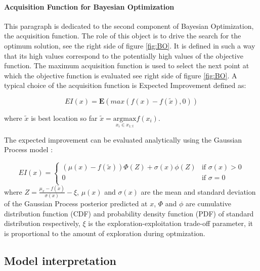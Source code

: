 \paragraph{ Acquisition Function for Bayesian Optimization} \mbox{}

This paragraph is dedicated to the second component of Bayesian Optimization, the acquisition function. The role of this object is to drive the search for the optimum solution, see the right side of figure \ref{fig:BO}. It is defined in such a way that its high values correspond to the potentially high values of the objective function. The maximum acquisition function is used to select the next point at which the objective function is evaluated see right side of figure \ref{fig:BO}. A typical choice of the acquisition function is Expected Improvement defined as: 

\begin{equation}
    EI(x) = \mathbf{E}\left(max( f(x)-f(\widetilde{x}) , 0) \right) 
\end{equation}

where $\widetilde{x}$ is best location so far $\widetilde{x} = \underset{{x_i \in x_{1:t}}}{\mathrm{argmax}} f(x_i)$. 

The expected improvement can be evaluated analytically using the Gaussian Process model \cite{GaussianProcesses}: 

\begin{equation}
    EI(x) =   \left\{ \begin{array}{ll}
(\mu(x)-f(\widetilde{x}))\Phi(Z) + \sigma(x)\phi(Z) & \textrm{if $\sigma(x)>0$}\\
0 & \textrm{if  $\sigma=0$}\\
\end{array} \right.
\end{equation}
where $Z= \frac{\mu_{x}-f(\widetilde{x})}{\sigma(x)}-\xi$, $\mu(x)$ and $\sigma(x)$ are the mean and standard deviation of the Gaussian Process posterior predicted at $x$, $\Phi$ and $\phi$ are cumulative distribution function (CDF) and probability density function (PDF) of standard distribution respectively, $\xi$ is the exploration-exploitation trade-off parameter, it is proportional to the amount of exploration during optmization. 

\subsection{Model interpretation}

